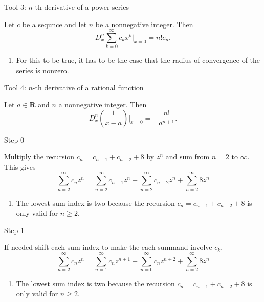 \documentclass[portrait,fleqn,12pt]{beamer}
\newcommand{\reals}{\mathbf{R}}
\newenvironment{handlist}
   {\begin{enumerate}[\faHandPointRight]
       \addtolength{\itemsep}{0.0\itemsep}}
     {\end{enumerate}}
\begin{document}
\begin{frame}{Tool 3:  $n$-th derivative of a power series}

Let $c$ be a sequnce and let $n$ be a nonnegative integer.  Then
\begin{equation}
       D^n_x \sum_{k=0}^\infty c_k x^k  \vert_{x=0} = n!  c_n.
\end{equation}
\begin{handlist}
   \item For this to be true, it has to be the case that  the radius of convergence of the series is nonzero.
\end{handlist}
\end{frame}

\begin{frame}{Tool 4:   $n$-th derivative of a rational function}

Let $a \in \reals$ and $n$ a nonnegative integer. Then
\begin{equation}
       D^n_x \left(\frac{1}{x-a}  \right) \vert_{x=0} = -\frac{n!}{a^{n+1}}.
\end{equation}
\end{frame}

\begin{frame}{Step 0}

Multiply the recursion $c_n = c_{n-1} + c_{n-2}+ 8$ by $z^n$ and sum from $n=2$ to $\infty$.  This gives
\begin{equation}
  \sum_{n=2}^\infty c_{n} z^n  =  \sum_{n=2}^\infty c_{n-1} z^n +  \sum_{n=2}^\infty c_{n-2} z^n +  \sum_{n=2}^\infty 8 z^n
\end{equation}
\begin{handlist}
\item The lowest sum index is two because the recursion  $c_n = c_{n-1} + c_{n-2}+ 8$ is only valid for $n \geq 2$.
\end{handlist}
\end{frame}
\begin{frame}{Step 1}

If needed shift each sum index to make the each summand involve $c_k$.
\begin{equation}
  \sum_{n=2}^\infty c_{n} z^n  =  \sum_{n=1}^\infty c_{n} z^{n+1} +  \sum_{n=0}^\infty c_{n} z^{n+2} +  \sum_{n=2}^\infty 8 z^n
\end{equation}
\begin{handlist}
\item The lowest sum index is two because the recursion  $c_n = c_{n-1} + c_{n-2}+ 8$ is only valid for $n \geq 2$.
\end{handlist}
\end{frame}
\end{document}
